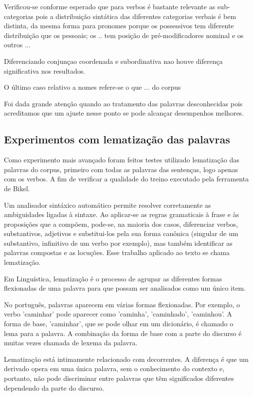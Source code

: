 Verificou-se conforme esperado que para verbos é bastante relevante as sub-categorias pois a distribuição sintática das diferentes categorias verbais é bem distinta, da mesma forma para pronomes porque os possessivos tem diferente distribuição que os pessoais; os .. tem posição de pré-modificadores nominal e os outros ...

Diferenciando conjunçao coordenada e subordinativa nao houve diferença significativa nos resultados.

O último caso relativo a nomes refere-se  o que ... do corpus 

Foi dada grande atenção quando ao tratamento das palavras desconhecidas pois acreditamos que um ajuste nesse ponto se pode alcançar desempenhos melhores.

\subsection{Experimentos com lematização das palavras}
\label{sec:lematizacao}

Como experimento mais avançado foram feitos testes utilizado lematização das palavras do corpus, primeiro com todas as palavras das sentenças, logo apenas com os verbos. A fim de verificar a qualidade do treino executado pela ferramenta de Bikel.

Um analisador sintáxico automático permite resolver corretamente as ambiguidades ligadas à sintaxe. Ao aplicar-se as
regras gramaticais à frase e às proposições que a compõem, pode-se, na maioria dos casos, diferenciar verbos,
substantivos, adjetivos e substitui-los pela sua forma canônica (singular de um substantivo, infinitivo de um verbo por
exemplo), mas também identificar as palavras compostas e as locuções. Esse trabalho aplicado ao texto se chama
lematização.

Em Linguística, lematização é o processo de agrupar as diferentes formas flexionadas de uma palavra para que possam ser analisados como um único item.

No português, palavras aparecem em várias formas flexionadas. Por exemplo, o verbo 'caminhar' pode aparecer como 'caminha', 'caminhado', 'caminhou'. A forma de base, 'caminhar', que se pode olhar em um dicionário, é chamado o lema para a palavra. A combinação da forma de base com a parte do discurso é muitas vezes chamada de lexema da palavra.

Lematização está intimamente relacionado com decorrentes. A diferença é que um derivado opera em uma única palavra, sem o conhecimento do contexto e, portanto, não pode discriminar entre palavras que têm significados diferentes dependendo da parte do discurso.

